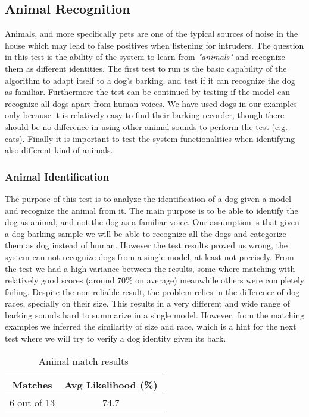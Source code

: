 \subsection{Animal Recognition}

Animals, and more specifically pets are one of the typical sources of noise in the house
which may lead to false positives when listening for intruders. The question in this test
is the ability of the system to learn from \textit{"animals"} and recognize them as different identities.
The first test to run is the basic capability of the algorithm to adapt itself to a dog's barking,
and test if it can recognize the dog as familiar. Furthermore the test can be continued by testing
if the model can recognize all dogs apart from human voices. We have used dogs in our examples
only because it is relatively easy to find their barking recorder, though there should be no
difference in using other animal sounds to perform the test (e.g. cats).
Finally it is important to test
the system functionalities when identifying also different kind of animals.

\subsubsection{Animal Identification}

The purpose of this test is to analyze the identification of a dog given a model
and recognize the animal from it. The main purpose is to be able to identify
the dog as animal, and not the dog as a familiar voice. Our assumption is that
given a dog barking sample we will be able to recognize all the dogs and categorize
them as dog instead of human. \newline
However the test results proved us wrong, the system can not recognize dogs from a single
model, at least not precisely. From the test we had a high variance between the results, some
where matching with relatively good scores (around 70\% on average) meanwhile others
were completely failing. Despite the non reliable result, the problem relies in the
difference of dog races, specially on their size. This results in a very different
and wide range of barking sounds hard to summarize in a single model. However, from
the matching examples we inferred the similarity of size and race, which is a hint for
the next test where we will try to verify a dog identity given its bark.

\begin{table}

\centering
\caption{Animal match results}
\label{tab:animalres}
\begin{tabular}{|c|c|} \hline
    \textbf{Matches} & \textbf{Avg Likelihood (\%)} \\ \hline
    6 out of 13 & 74.7 \\ \hline
\end{tabular}
\end{table}


